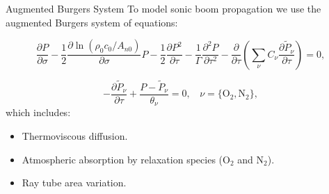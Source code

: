 \documentclass{beamer}
\newcounter{sectionframecount}
\begin{document}
\begin{frame}[t]{Augmented Burgers System}
  To model sonic boom propagation we use the augmented Burgers system of equations:

  \begin{equation}
    \dfrac{\partial P}{\partial \sigma}
    -\dfrac{1}{2}\dfrac{\partial \ln(\rho_0c_0/A_{n0})}{\partial \sigma}P
    -\dfrac{1}{2}\dfrac{\partial P^2}{\partial \tau}
    -\dfrac{1}{\Gamma}\dfrac{\partial ^2 P}{\partial \tau^2}
    -\dfrac{\partial }{\partial \tau}\left(\sum_{\nu} C_\nu \dfrac{\partial\tilde{P}_\nu}{\partial \tau}\right)
    =0,
  \end{equation}

  \begin{equation}
    -\dfrac{\partial \tilde{P}_\nu}{\partial \tau} + \dfrac{P - \tilde{P}_\nu}{\theta_\nu} = 0,~~~~\nu = \{\text{O}_2,\text{N}_2\},
  \end{equation}
  which includes:
  \begin{itemize}
    \item Thermoviscous diffusion.
    \item Atmospheric absorption by relaxation species (O$_2$ and N$_2$).
    \item Ray tube area variation.
  \end{itemize}

\end{frame}

\end{document}
